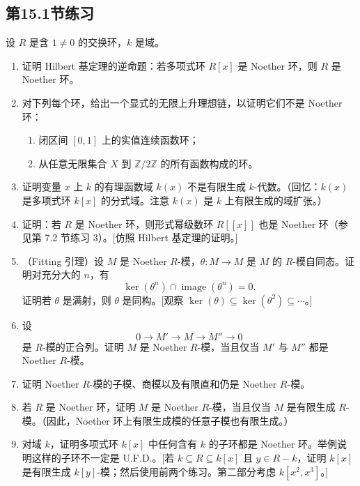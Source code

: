 \subsection*{第15.1节练习}

设 $R$ 是含 $1\ne0$ 的交换环，$k$ 是域。

\begin{enumerate}[label=\arabic*.]
	\item 证明 Hilbert 基定理的逆命题：若多项式环 $R[x]$ 是 Noether 环，则 $R$ 是 Noether 环。
	
	\item 对下列每个环，给出一个显式的无限上升理想链，以证明它们不是 Noether 环：
	\begin{enumerate}[label=(\alph*)]
		\item 闭区间 $[0,1]$ 上的实值连续函数环；
		\item 从任意无限集合 $X$ 到 $\mathbb Z/2\mathbb Z$ 的所有函数构成的环。
	\end{enumerate}
	
	\item 证明变量 $x$ 上 $k$ 的有理函数域 $k(x)$ 不是有限生成 $k$-代数。（回忆：$k(x)$ 是多项式环 $k[x]$ 的分式域。注意 $k(x)$ 是 $k$ 上有限生成的域扩张。）
	
	\item 证明：若 $R$ 是 Noether 环，则形式幂级数环 $R[[x]]$ 也是 Noether 环（参见第 7.2 节练习 3）。[仿照 Hilbert 基定理的证明。]
	
	\item（Fitting 引理）设 $M$ 是 Noether $R$-模，$\theta:M\to M$ 是 $M$ 的 $R$-模自同态。证明对充分大的 $n$，有
	\[
	\ker(\theta^n)\cap\operatorname{image}(\theta^n)=0.
	\]
	证明若 $\theta$ 是满射，则 $\theta$ 是同构。[观察 $\ker(\theta)\subseteq\ker(\theta^2)\subseteq\cdots$。]
	
	\item 设
	\[
	0\longrightarrow M'\longrightarrow M\longrightarrow M''\longrightarrow0
	\]
	是 $R$-模的正合列。证明 $M$ 是 Noether $R$-模，当且仅当 $M'$ 与 $M''$ 都是 Noether $R$-模。
	
	\item 证明 Noether $R$-模的子模、商模以及有限直和仍是 Noether $R$-模。
	
	\item 若 $R$ 是 Noether 环，证明 $M$ 是 Noether $R$-模，当且仅当 $M$ 是有限生成 $R$-模。（因此，Noether 环上有限生成模的任意子模也有限生成。）
	
	\item 对域 $k$，证明多项式环 $k[x]$ 中任何含有 $k$ 的子环都是 Noether 环。举例说明这样的子环不一定是 U.F.D.。[若 $k\subseteq R\subseteq k[x]$ 且 $y\in R-k$，证明 $k[x]$ 是有限生成 $k[y]$-模；然后使用前两个练习。第二部分考虑 $k[x^2,x^3]$。]
	

\end{enumerate}

